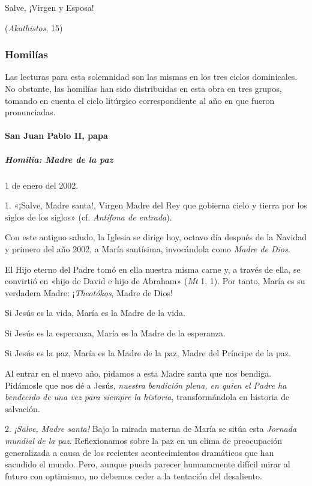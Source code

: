 \documentclass[]{article}
\let\oldparagraph\paragraph
\renewcommand{\paragraph}[1]{\oldparagraph{#1}\mbox{}}
\let\oldsubparagraph\subparagraph
\renewcommand{\subparagraph}[1]{\oldsubparagraph{#1}\mbox{}}
\begin{document}
Salve, ¡Virgen y Esposa!

(\emph{Akathistos}, 15)

\subsubsection{Homilías}\label{homiluxedas-9}

Las lecturas para esta solemnidad son las mismas en los tres ciclos
dominicales. No obstante, las homilías han sido distribuidas en esta
obra en tres grupos, tomando en cuenta el ciclo litúrgico
correspondiente al año en que fueron pronunciadas.

\paragraph{San Juan Pablo II, papa}\label{san-juan-pablo-ii-papa-6}

\subparagraph{Homilía: Madre de la
paz}\label{homiluxeda-madre-de-la-paz}

1 de enero del 2002.

1. «¡Salve, Madre santa!, Virgen Madre del Rey que gobierna cielo y
tierra por los siglos de los siglos» (cf. \emph{Antífona de entrada}).

Con este antiguo saludo, la Iglesia se dirige hoy, octavo día después de
la Navidad y primero del año 2002, a María santísima, invocándola como
\emph{Madre de Dios}.

El Hijo eterno del Padre tomó en ella nuestra misma carne y, a través de
ella, se convirtió en «hijo de David e hijo de Abraham» (\emph{Mt} 1,
1). Por tanto, María es su verdadera Madre: ¡\emph{Theotókos}, Madre de
Dios!

Si Jesús es la vida, María es la Madre de la vida.

Si Jesús es la esperanza, María es la Madre de la esperanza.

Si Jesús es la paz, María es la Madre de la paz, Madre del Príncipe de
la paz.

Al entrar en el nuevo año, pidamos a esta Madre santa que nos bendiga.
Pidámosle que nos dé a Jesús, \emph{nuestra bendición plena, en quien el
Padre ha bendecido de una vez para siempre la historia}, transformándola
en historia de salvación.

2. \emph{¡Salve, Madre santa!} Bajo la mirada materna de María se sitúa
esta \emph{Jornada mundial de la paz}. Reflexionamos sobre la paz en un
clima de preocupación generalizada a causa de los recientes
acontecimientos dramáticos que han sacudido el mundo. Pero, aunque pueda
parecer humanamente difícil mirar al futuro con optimismo, no debemos
ceder a la tentación del desaliento.
\end{document}

